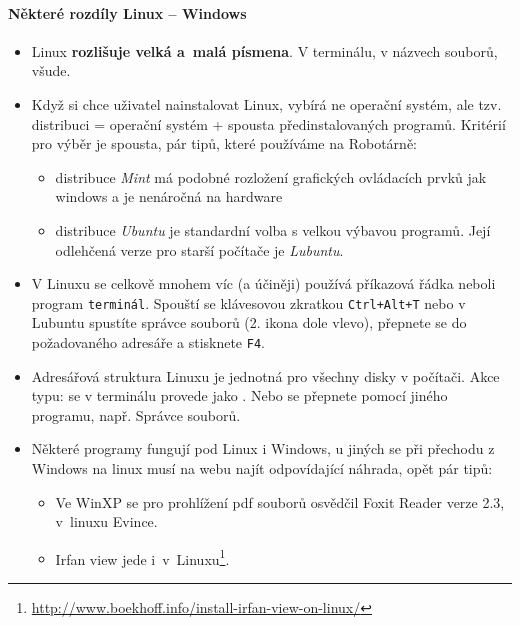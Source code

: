 \paragraph{Některé rozdíly Linux -- Windows}

\begin{itemize}

\item Linux {\bf rozlišuje velká a~malá písmena}. V terminálu, v názvech souborů, všude. 

\item Když si chce uživatel nainstalovat Linux, vybírá ne operační systém, ale tzv. distribuci = operační systém + spousta předinstalovaných programů. Kritérií pro výběr je spousta, pár tipů, které používáme na Robotárně: 

	\begin{itemize}
		\item distribuce {\it Mint} má podobné rozložení grafických ovládacích prvků jak windows a je nenáročná na hardware 
	
		\item distribuce {\it Ubuntu} je standardní volba s velkou výbavou programů. Její odlehčená verze pro starší počítače je {\it Lubuntu}. 
	
	\end{itemize}  

\item V Linuxu se celkově mnohem víc (a účiněji) používá příkazová řádka neboli program  {\tt terminál}.  Spouští se klávesovou zkratkou {\tt Ctrl+Alt+T} nebo v Lubuntu spustíte správce souborů (2. ikona dole vlevo), přepnete se do požadovaného adresáře a stisknete {\tt F4}. \label{terminal}

\item Adresářová struktura Linuxu je jednotná pro všechny disky v počítači. Akce typu: {\it {} } se v terminálu provede jako {\it {} }. Nebo se přepnete pomocí jiného programu, např. Správce souborů. 	
	
\item Některé programy fungují pod Linux i Windows, u jiných se při přechodu z Windows na linux musí na webu najít odpovídající náhrada, opět pár tipů: 

	\begin{itemize}
		\item Ve WinXP se pro prohlížení pdf souborů osvědčil Foxit Reader verze 2.3, v~linuxu Evince.  
			
		\item Irfan view jede i~v~Linuxu\footnote{\url{http://www.boekhoff.info/install-irfan-view-on-linux/}}.
	
	\end{itemize}

	
\end{itemize}


